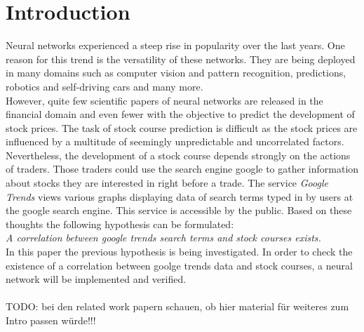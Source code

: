 \section{Introduction}
\label{sec:introduction}
Neural networks experienced a steep rise in popularity over the last years. One reason for this trend is the versatility of these networks. They are being deployed in many domains such as computer vision and pattern recognition, predictions, robotics and self-driving cars and many more. 
\\
However, quite few scientific papers of neural networks are released in the financial domain and even fewer with the objective to predict the development of stock prices. 
The task of stock course prediction is difficult as the stock prices are influenced by a multitude of seemingly unpredictable and uncorrelated factors. Nevertheless, the development of a stock course depends strongly on the actions of traders. Those traders could use the search engine google to gather information about stocks they are interested in right before a trade. The service \textit{Google Trends} views various graphs displaying data of search terms typed in by users at the google search engine. This service is accessible by the public. Based on these thoughts the following hypothesis can be formulated: \\
\textit{A correlation between google trends search terms and stock courses exists. } \\
In this paper the previous hypothesis is being investigated. In order to check the existence of a correlation between goolge trends data and stock courses, a neural network will be implemented and verified. 
\\ \\
TODO: bei den related work papern schauen, ob hier material für weiteres zum Intro passen würde!!!
\\